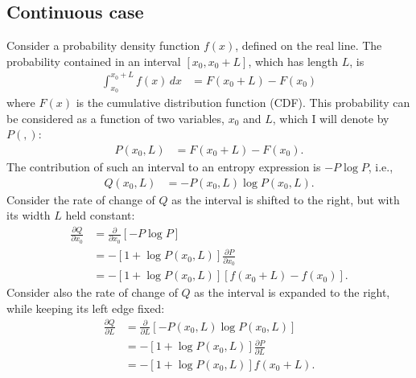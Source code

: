 \documentclass[entropy,article,accept,oneauthor,pdftex,10pt,a4paper]{mdpi}
\begin{document}
\subsection*{Continuous case}

Consider a probability density function $f(x)$, defined on the real
line. The probability contained in an interval
$[x_0, x_0 + L]$, which has length $L$, is
\begin{align}
\int_{x_0}^{x_0 + L} f(x) \, dx &= F(x_0 + L) - F(x_0)
\end{align}
where $F(x)$ is the cumulative distribution function (CDF).
This probability can be considered as a function of two variables,
$x_0$ and $L$, which I will denote by $P(,)$:
\begin{align}
P(x_0, L) &= F(x_0 + L) - F(x_0).
\end{align}
The contribution of such an interval to an entropy expression
is $-P\log P$, i.e.,
\begin{align}
Q(x_0, L) &= -P(x_0, L) \log P(x_0, L).
\end{align}
Consider the rate of change of $Q$ as the interval is shifted to
the right, but with its width $L$ held constant:
\begin{align}
\frac{\partial Q}{\partial x_0} &= \frac{\partial}{\partial x_0}
    \left[-P\log P\right] \\
    &= -\left[1 + \log P(x_0, L)\right]\frac{\partial P}{\partial x_0} \\
    &= -\left[1 + \log P(x_0, L)\right]\left[f(x_0 + L) - f(x_0)\right].
\end{align}
Consider also the rate of change of $Q$ as the interval is
expanded to the right, while keeping its left edge fixed:
\begin{align}
\frac{\partial Q}{\partial L} &= \frac{\partial}{\partial L}
    \left[-P(x_0, L) \log P(x_0, L)\right] \\
    &= -\left[1 + \log P(x_0, L)\right]\frac{\partial P}{\partial L} \\
    &= -\left[1 + \log P(x_0, L)\right]f(x_0 + L).
\end{align}
\end{document}
